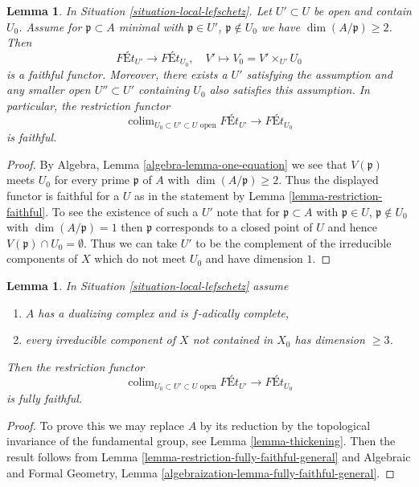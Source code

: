 \documentclass{stacks-project}
\theoremstyle{plain}
\newtheorem{lemma}[subsection]{Lemma}
\theoremstyle{definition}
\theoremstyle{remark}
\numberwithin{equation}{subsection}
\def\colim{\mathop{\mathrm{colim}}\nolimits}
\begin{document}
\begin{lemma}
\label{lemma-faithful-general}
In Situation \ref{situation-local-lefschetz}. Let $U' \subset U$
be open and contain $U_0$. Assume for $\mathfrak p \subset A$ minimal
with $\mathfrak p \in U'$, $\mathfrak p \not \in U_0$ we have
$\dim(A/\mathfrak p) \geq 2$. Then
$$
\textit{F\'Et}_{U'} \longrightarrow \textit{F\'Et}_{U_0},\quad
V' \longmapsto V_0 = V' \times_{U'} U_0
$$
is a faithful functor. Moreover, there exists a $U'$ satisfying
the assumption and any smaller open $U'' \subset U'$ containing
$U_0$ also satisfies this assumption. In particular, the restriction
functor
$$
\colim_{U_0 \subset U' \subset U\text{ open}} \textit{F\'Et}_{U'}
\longrightarrow
\textit{F\'Et}_{U_0}
$$
is faithful.
\end{lemma}

\begin{proof}
By Algebra, Lemma \ref{algebra-lemma-one-equation}
we see that $V(\mathfrak p)$ meets $U_0$ for
every prime $\mathfrak p$ of $A$ with $\dim(A/\mathfrak p) \geq 2$.
Thus the displayed functor is faithful for a $U$ as in the statement
by Lemma \ref{lemma-restriction-faithful}.
To see the existence of such a $U'$ note that for
$\mathfrak p \subset A$ with $\mathfrak p \in U$,
$\mathfrak p \not \in U_0$ with $\dim(A/\mathfrak p) = 1$
then $\mathfrak p$ corresponds to a closed point of $U$
and hence $V(\mathfrak p) \cap U_0 = \emptyset$.
Thus we can take $U'$ to be the complement of the irreducible
components of $X$ which do not meet $U_0$ and have dimension $1$.
\end{proof}

\begin{lemma}
\label{lemma-fully-faithful-general-better}
In Situation \ref{situation-local-lefschetz} assume
\begin{enumerate}
\item $A$ has a dualizing complex and is $f$-adically complete,
\item every irreducible component of $X$ not contained in $X_0$
has dimension $\geq 3$.
\end{enumerate}
Then the restriction functor
$$
\colim_{U_0 \subset U' \subset U\text{ open}} \textit{F\'Et}_{U'}
\longrightarrow
\textit{F\'Et}_{U_0}
$$
is fully faithful.
\end{lemma}

\begin{proof}
To prove this we may replace $A$ by its reduction by the topological
invariance of the fundamental group, see Lemma \ref{lemma-thickening}.
Then the result follows from
Lemma \ref{lemma-restriction-fully-faithful-general}
and Algebraic and Formal Geometry, Lemma
\ref{algebraization-lemma-fully-faithful-general}.
\end{proof}
\end{document}

